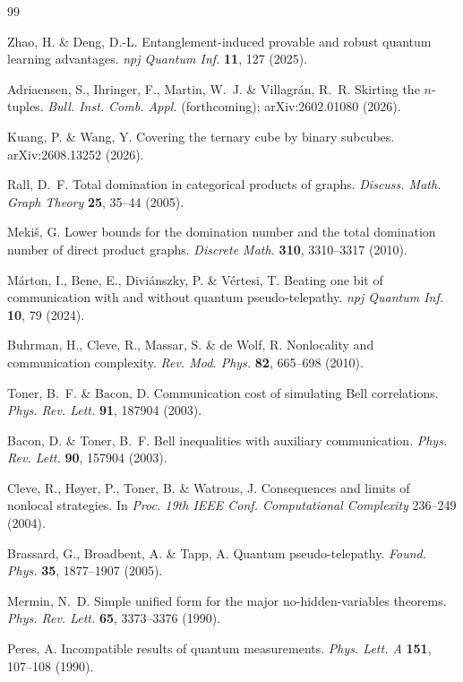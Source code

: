 \documentclass[11pt,letterpaper]{article}
\begin{document}
\begin{thebibliography}{99}

Zhao, H. \& Deng, D.-L. Entanglement-induced provable and robust quantum learning advantages. \emph{npj Quantum Inf.} \textbf{11}, 127 (2025).

Adriaensen, S., Ihringer, F., Martin, W.~J. \& Villagr\'an, R.~R. Skirting the $n$-tuples. \emph{Bull. Inst. Comb. Appl.} (forthcoming); arXiv:2602.01080 (2026).

Kuang, P. \& Wang, Y. Covering the ternary cube by binary subcubes. arXiv:2608.13252 (2026).

Rall, D.~F. Total domination in categorical products of graphs. \emph{Discuss. Math. Graph Theory} \textbf{25}, 35--44 (2005).

Meki\v{s}, G. Lower bounds for the domination number and the total domination number of direct product graphs. \emph{Discrete Math.} \textbf{310}, 3310--3317 (2010).

M\'arton, I., Bene, E., Divi\'anszky, P. \& V\'ertesi, T. Beating one bit of communication with and without quantum pseudo-telepathy. \emph{npj Quantum Inf.} \textbf{10}, 79 (2024).

Buhrman, H., Cleve, R., Massar, S. \& de Wolf, R. Nonlocality and communication complexity. \emph{Rev. Mod. Phys.} \textbf{82}, 665--698 (2010).

Toner, B.~F. \& Bacon, D. Communication cost of simulating Bell correlations. \emph{Phys. Rev. Lett.} \textbf{91}, 187904 (2003).

Bacon, D. \& Toner, B.~F. Bell inequalities with auxiliary communication. \emph{Phys. Rev. Lett.} \textbf{90}, 157904 (2003).

Cleve, R., H{\o}yer, P., Toner, B. \& Watrous, J. Consequences and limits of nonlocal strategies. In \emph{Proc. 19th IEEE Conf. Computational Complexity} 236--249 (2004).

Brassard, G., Broadbent, A. \& Tapp, A. Quantum pseudo-telepathy. \emph{Found. Phys.} \textbf{35}, 1877--1907 (2005).

Mermin, N.~D. Simple unified form for the major no-hidden-variables theorems. \emph{Phys. Rev. Lett.} \textbf{65}, 3373--3376 (1990).

Peres, A. Incompatible results of quantum measurements. \emph{Phys. Lett. A} \textbf{151}, 107--108 (1990).

\end{thebibliography}
\end{document}
